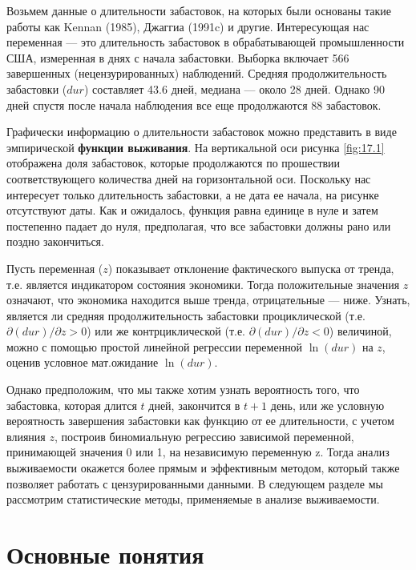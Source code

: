 \noindent
Возьмем данные о длительности забастовок, на которых были основаны %
такие работы как Kennan (1985), Джаггиа (1991c) и другие. Интересующая нас переменная --- это длительность забастовок в обрабатывающей промышленности США, измеренная в днях с начала забастовки. Выборка включает 566 завершенных (нецензурированных) наблюдений. Средняя продолжительность забастовки ($dur$) составляет 43.6 дней, медиана --- около 28 дней. Однако 90 дней спустя после начала наблюдения все еще продолжаются 88 забастовок.

Графически информацию о длительности забастовок можно представить в виде эмпирической \textbf{функции выживания}. На вертикальной оси рисунка \ref{fig:17.1} отображена доля забастовок, которые продолжаются по прошествии соответствующего количества дней на горизонтальной оси. Поскольку нас интересует только длительность забастовки, а не дата ее начала, на рисунке отсутствуют даты. Как и ожидалось, функция равна единице в нуле и затем постепенно падает до нуля, предполагая, что все забастовки должны рано или поздно закончиться.

Пусть переменная ($z$) показывает отклонение фактического выпуска от тренда, т.е. является индикатором состояния экономики. Тогда положительные значения $z$ означают, что экономика находится выше тренда, отрицательные --- ниже. Узнать, является ли средняя продолжительность забастовки проциклической (т.е. $\partial (dur) / \partial z > 0$) или же контрциклической (т.е. $\partial (dur) / \partial z < 0$) величиной, можно с помощью простой линейной регрессии переменной $\ln (dur)$ на $z$, оценив условное мат.ожидание $\ln (dur)$.

Однако предположим, что мы также хотим узнать вероятность того, что забастовка, которая длится $t$ дней, закончится в $t+1$ день, или же условную вероятность завершения забастовки как функцию от ее длительности, с учетом влияния $z$, построив биномиальную регрессию зависимой переменной, принимающей значения 0 или 1, на независимую переменную z. Тогда анализ выживаемости окажется более прямым и эффективным методом, который также позволяет работать с цензурированными данными. В следующем разделе мы рассмотрим статистические методы, применяемые в анализе выживаемости.




\section{Основные понятия}\label{sec:17.3}

